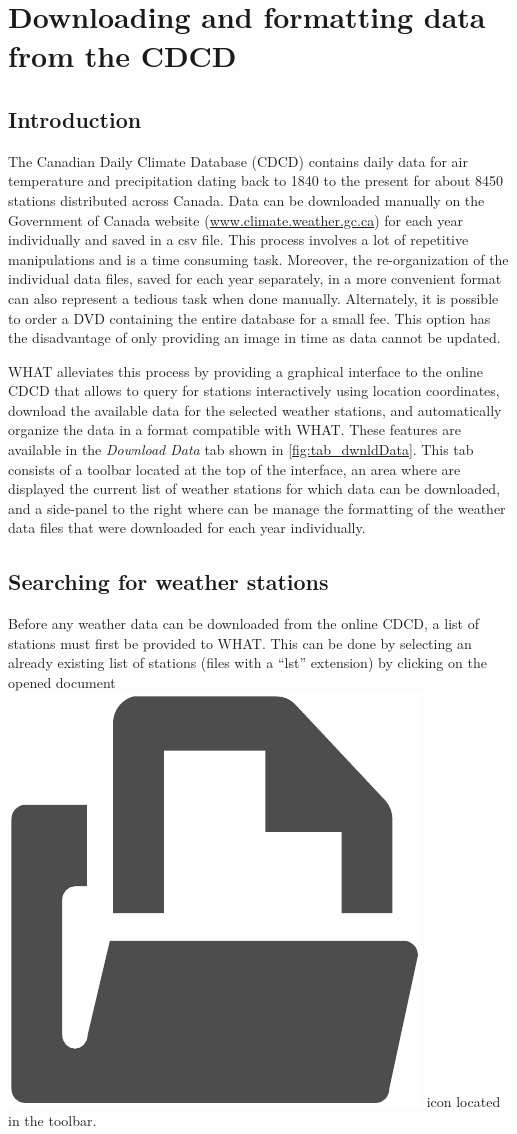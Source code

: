 \documentclass[WHATMANUAL.tex]{subfiles}
\begin{document}
\section{Downloading and formatting data from the CDCD}

\subsection{Introduction}

The Canadian Daily Climate Database (CDCD) contains daily data for air temperature and precipitation dating back to 1840 to the present for about 8450 stations distributed across Canada. Data can be downloaded manually on the Government of Canada website (\url{www.climate.weather.gc.ca}) for each year individually and saved in a csv file. This process involves a lot of repetitive manipulations and is a time consuming task. Moreover, the re-organization of the individual data files, saved for each year separately, in a more convenient format can also represent a tedious task when done manually. Alternately, it is possible to order a DVD containing the entire database for a small fee. This option has the disadvantage of only providing an image in time as data cannot be updated.  

WHAT alleviates this process by providing a graphical interface to the online CDCD that allows to query for stations interactively using location coordinates, download the available data for the selected weather stations, and automatically organize the data in a format compatible with WHAT. These features are available in the \emph{Download Data} tab shown in \cref{fig:tab_dwnldData}. This tab consists of a toolbar located at the top of the interface, an area where are displayed the current list of weather stations for which data can be downloaded, and a side-panel to the right where can be manage the formatting of the weather data files that were downloaded for each year individually. 

\subsection{Searching for weather stations}

Before any weather data can be downloaded from the online CDCD, a list of stations must first be provided to WHAT. This can be done by selecting an already existing list of stations (files with a ``lst'' extension) by clicking on the opened document~{\includegraphics[height=2ex]{img/open_file}} icon located in the toolbar. 
\end{document}
